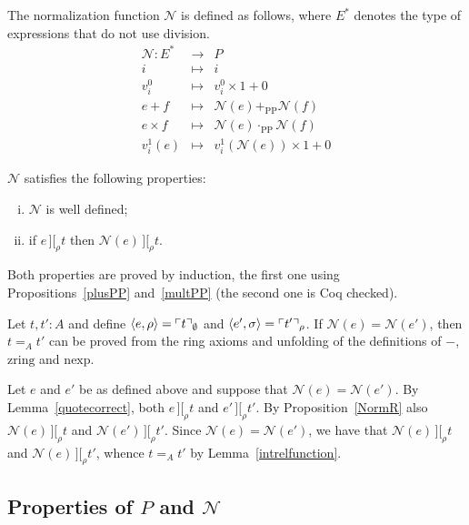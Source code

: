 \documentclass[numreferences]{kluwer}
\newcommand{\intII}{\,]\![}
\newcommand{\intrel}{\mathbin{\intII_{\rho}}}
\newcommand{\N}{\ensuremath{\mathcal{N}}}
\newcommand{\zring}{\ensuremath{\mathrm{zring}}}
\newcommand{\nexp}{\ensuremath{\mathrm{nexp}}}
\newcommand{\mlfn}[2]{\ensuremath\ulcorner{#1}\urcorner_{#2}}
\newcommand{\plusPP}{\ensuremath{+_{\mathrm{PP}}}}
\newcommand{\multPP}{\ensuremath{\cdot_{\mathrm{PP}}}}
\begin{document}
\begin{article}
\begin{definition}\label{defn:NormR}
The normalization function $\N$ is defined as follows, where $E^\ast$ denotes
the type of expressions that do not use division.
\begin{eqnarray*}
\N : E^\ast & \to & P \\
 i & \mapsto & i \\
 v^0_i & \mapsto & v^0_i\times 1+0 \\
 e+f & \mapsto & \N(e)\plusPP\N(f) \\
 e\times f& \mapsto & \N(e)\multPP\N(f) \\
 v^1_i(e) & \mapsto & v^1_i(\N(e))\times 1+0
\end{eqnarray*}
\end{definition}
\begin{proposition}\label{NormR} {\N} satisfies the following properties:
\begin{enumerate}[(i)]
\item {\N} is well defined;
\item\label{normpresint} if $e\intrel t$ then $\N(e)\intrel t$.
\end{enumerate}
\end{proposition}
\begin{pf}
Both properties are proved by induction, the first one using
Propositions~\ref{plusPP} and~\ref{multPP}
(the second one is Coq checked).
\end{pf}

\begin{corollary}\label{correctness}
Let $t,t':A$ and define $\langle e,\rho\rangle=\mlfn{t}{\emptyset}$ and
$\langle e',\sigma\rangle=\mlfn{t'}{\rho}$.  If $\N(e)=\N(e')$, then
$t=_A t'$ can be proved from the ring axioms and unfolding of
the definitions of $-$, {\zring} and {\nexp}.
\end{corollary}
\begin{pf}
Let $e$ and $e'$ be as defined above and suppose that $\N(e)=\N(e')$.
By Lemma~\ref{quotecorrect}, both $e\intrel t$ and $e'\intrel t'$.
By Proposition~\ref{NormR} also $\N(e)\intrel t$ and $\N(e')\intrel t'$.
Since $\N(e)=\N(e')$, we have that $\N(e)\intrel t$ and $\N(e)\intrel t'$,
whence $t=_A t'$ by Lemma~\ref{intrelfunction}.
\end{pf}

\subsection{Properties of $P$ and $\N$}\label{PNprops}


\end{article}
\end{document}
